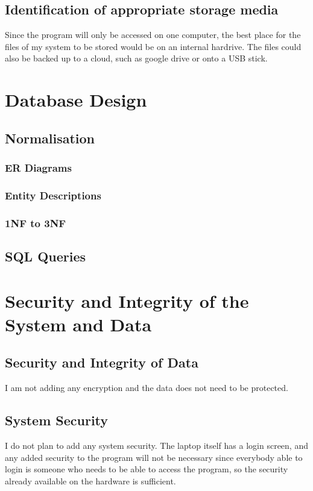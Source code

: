 \subsection{Identification of appropriate storage media}
Since the program will only be accessed on one computer, the best place for the files of my system to be stored would be on an internal hardrive. The files could also be backed up to a cloud, such as google drive or onto a USB stick.
\section{Database Design}

\subsection{Normalisation}

\subsubsection{ER Diagrams}

\subsubsection{Entity Descriptions}

\subsubsection{1NF to 3NF}

\subsection{SQL Queries}

\section{Security and Integrity of the System and Data}

\subsection{Security and Integrity of Data}
I am not adding any encryption and the data does not need to be protected.

\subsection{System Security}
I do not plan to add any system security. The laptop itself has a login screen, and any added security to the program will not be necessary since everybody able to login is someone who needs to be able to access the program, so the security already available on the hardware is sufficient. 
